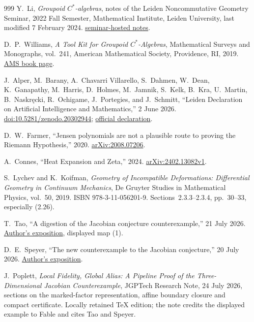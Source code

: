 \begin{thebibliography}{999}
Y.~Li,
\emph{Groupoid $C^*$-algebras},
notes of the Leiden Noncommutative Geometry Seminar, 2022 Fall Semester,
Mathematical Institute, Leiden University, last modified 7 February 2024.
\href{https://ncg-leiden.github.io/groupoid2022/groupoid_notes.pdf}
{seminar-hosted notes}.

D.~P.~Williams,
\emph{A Tool Kit for Groupoid $C^*$-Algebras},
Mathematical Surveys and Monographs, vol.~241,
American Mathematical Society, Providence, RI, 2019.
\href{https://bookstore.ams.org/surv-241/}{AMS book page}.

J.~Alper, M.~Barany, A.~Chavarri Villarello, S.~Dahmen, W.~Dean,
K.~Ganapathy, M.~Harris, D.~Holmes, M.~Jamnik, S.~Kelk, B.~Kra,
U.~Martin, B.~Naskr\k{e}cki, R.~Ochigame, J.~Portegies, and J.~Schmitt,
``Leiden Declaration on Artificial Intelligence and Mathematics,''
2 June 2026.
\href{https://doi.org/10.5281/zenodo.20302944}{doi:10.5281/zenodo.20302944};
\href{https://leidendeclaration.ai/}{official declaration}.

D.~W.~Farmer,
``Jensen polynomials are not a plausible route to proving the Riemann Hypothesis,''
2020. \href{https://arxiv.org/abs/2008.07206}{arXiv:2008.07206}.

A.~Connes,
``Heat Expansion and Zeta,''
2024. \href{https://arxiv.org/abs/2402.13082v1}{arXiv:2402.13082v1}.

S.~Lychev and K.~Koifman, \emph{Geometry of Incompatible Deformations:
Differential Geometry in Continuum Mechanics}, De Gruyter Studies in
Mathematical Physics, vol.~50, 2019. ISBN 978-3-11-056201-9.
Sections~2.3.3--2.3.4, pp.~30--33, especially (2.26).

T.~Tao, ``A digestion of the Jacobian conjecture counterexample,''
21 July 2026.
\href{https://terrytao.wordpress.com/2026/07/21/a-digestion-of-the-jacobian-conjecture-counterexample/}{Author's exposition}, displayed map (1).

D.~E.~Speyer, ``The new counterexample to the Jacobian conjecture,''
20 July 2026.
\href{https://sbseminar.wordpress.com/2026/07/20/the-new-counterexample-to-the-jacobian-conjecture/}{Author's exposition}.

J.~Poplett, \emph{Local Fidelity, Global Alias: A Pipeline Proof of the
Three-Dimensional Jacobian Counterexample}, JGPTech Research Note,
24 July 2026, sections on the marked-factor representation, affine
boundary closure and compact certificate. Locally retained TeX edition;
the note credits the displayed example to Fable and cites Tao and Speyer.


\end{thebibliography}
